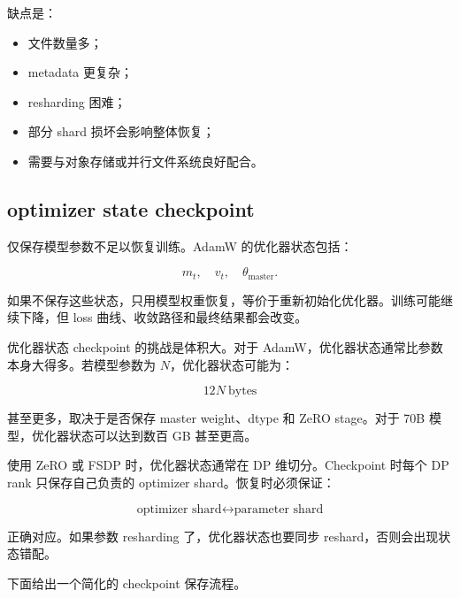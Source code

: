 缺点是：

\begin{itemize}
\item 文件数量多；
\item metadata 更复杂；
\item resharding 困难；
\item 部分 shard 损坏会影响整体恢复；
\item 需要与对象存储或并行文件系统良好配合。
\end{itemize}

\subsection{optimizer state checkpoint}
\label{subsec:optimizer-state-checkpoint}

仅保存模型参数不足以恢复训练。AdamW 的优化器状态包括：

\[
m_t,\quad v_t,\quad \theta_{\mathrm{master}}.
\]

如果不保存这些状态，只用模型权重恢复，等价于重新初始化优化器。训练可能继续下降，但 loss 曲线、收敛路径和最终结果都会改变。

优化器状态 checkpoint 的挑战是体积大。对于 AdamW，优化器状态通常比参数本身大得多。若模型参数为 $N$，优化器状态可能为：

\[
12N\ \mathrm{bytes}
\]

甚至更多，取决于是否保存 master weight、dtype 和 ZeRO stage。对于 70B 模型，优化器状态可以达到数百 GB 甚至更高。

使用 ZeRO 或 FSDP 时，优化器状态通常在 DP 维切分。Checkpoint 时每个 DP rank 只保存自己负责的 optimizer shard。恢复时必须保证：

\[
\text{optimizer shard}
\leftrightarrow
\text{parameter shard}
\]

正确对应。如果参数 resharding 了，优化器状态也要同步 reshard，否则会出现状态错配。

下面给出一个简化的 checkpoint 保存流程。

